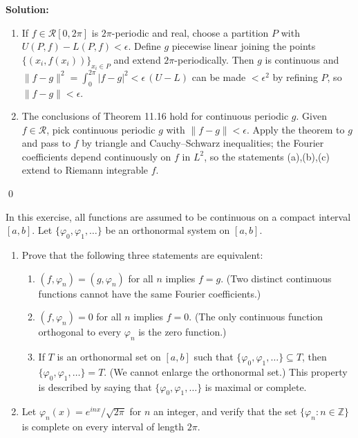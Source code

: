 \noindent\textbf{Solution:}
\begin{enumerate}[label=(\alph*)]
\item If $f\in\mathcal R[0,2\pi]$ is $2\pi$-periodic and real, choose a partition $P$ with $U(P,f)-L(P,f)<\epsilon$. Define $g$ piecewise linear joining the points $\{(x_i,f(x_i))\}_{x_i\in P}$ and extend $2\pi$-periodically. Then $g$ is continuous and $\|f-g\|^2=\int_0^{2\pi}|f-g|^2<\epsilon\,(U-L)$ can be made $<\epsilon^2$ by refining $P$, so $\|f-g\|<\epsilon$.
\item The conclusions of Theorem 11.16 hold for continuous periodic $g$. Given $f\in\mathcal R$, pick continuous periodic $g$ with $\|f-g\|<\epsilon$. Apply the theorem to $g$ and pass to $f$ by triangle and Cauchy–Schwarz inequalities; the Fourier coefficients depend continuously on $f$ in $L^2$, so the statements (a),(b),(c) extend to Riemann integrable $f$.
\end{enumerate}\qed


\begin{problembox}
In this exercise, all functions are assumed to be continuous on a compact interval $[a, b]$. Let $\{\varphi_0, \varphi_1, \dots\}$ be an orthonormal system on $[a, b]$.
\begin{enumerate}[label=(\alph*)]
\item Prove that the following three statements are equivalent:
\begin{enumerate}[label=\arabic*)]
\item $(f, \varphi_n) = (g, \varphi_n)$ for all $n$ implies $f = g$. (Two distinct continuous functions cannot have the same Fourier coefficients.)
\item $(f, \varphi_n) = 0$ for all $n$ implies $f = 0$. (The only continuous function orthogonal to every $\varphi_n$ is the zero function.)
\item If $T$ is an orthonormal set on $[a, b]$ such that $\{\varphi_0, \varphi_1, \dots\} \subseteq T$, then $\{\varphi_0, \varphi_1, \dots\} = T$. (We cannot enlarge the orthonormal set.) This property is described by saying that $\{\varphi_0, \varphi_1, \dots\}$ is maximal or complete.
\end{enumerate}
\item Let $\varphi_n(x) = e^{inx}/\sqrt{2\pi}$ for $n$ an integer, and verify that the set $\{\varphi_n : n \in \mathbb{Z}\}$ is complete on every interval of length $2\pi$.
\end{enumerate}
\end{problembox}

